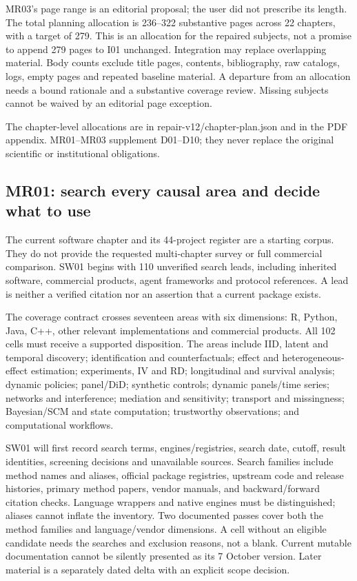 \documentclass[
  11pt,
  a4paper,
]{article}
\begin{document}
MR03's page range is an editorial proposal; the user did not prescribe
its length. The total planning allocation is 236--322 substantive pages
across 22 chapters, with a target of 279. This is an allocation for the
repaired subjects, not a promise to append 279 pages to I01 unchanged.
Integration may replace overlapping material. Body counts exclude title
pages, contents, bibliography, raw catalogs, logs, empty pages and
repeated baseline material. A departure from an allocation needs a bound
rationale and a substantive coverage review. Missing subjects cannot be
waived by an editorial page exception.

The chapter-level allocations are in repair-v12/chapter-plan.json and in
the PDF appendix. MR01--MR03 supplement D01--D10; they never replace the
original scientific or institutional obligations.

\hypertarget{mr01-search-every-causal-area-and-decide-what-to-use}{%
\subsection{MR01: search every causal area and decide what to
use}\label{mr01-search-every-causal-area-and-decide-what-to-use}}

The current software chapter and its 44-project register are a starting
corpus. They do not provide the requested multi-chapter survey or full
commercial comparison. SW01 begins with 110 unverified search leads,
including inherited software, commercial products, agent frameworks and
protocol references. A lead is neither a verified citation nor an
assertion that a current package exists.

The coverage contract crosses seventeen areas with six dimensions: R,
Python, Java, C++, other relevant implementations and commercial
products. All 102 cells must receive a supported disposition. The areas
include IID, latent and temporal discovery; identification and
counterfactuals; effect and heterogeneous-effect estimation;
experiments, IV and RD; longitudinal and survival analysis; dynamic
policies; panel/DiD; synthetic controls; dynamic panels/time series;
networks and interference; mediation and sensitivity; transport and
missingness; Bayesian/SCM and state computation; trustworthy
observations; and computational workflows.

SW01 will first record search terms, engines/registries, search date,
cutoff, result identities, screening decisions and unavailable sources.
Search families include method names and aliases, official package
registries, upstream code and release histories, primary method papers,
vendor manuals, and backward/forward citation checks. Language wrappers
and native engines must be distinguished; aliases cannot inflate the
inventory. Two documented passes cover both the method families and
language/vendor dimensions. A cell without an eligible candidate needs
the searches and exclusion reasons, not a blank. Current mutable
documentation cannot be silently presented as its 7 October version.
Later material is a separately dated delta with an explicit scope
decision.
\end{document}
